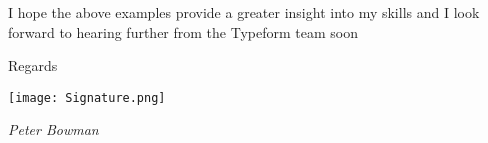 \documentclass[10pt,A4]{article}
\begin{document}
    \par \vspace{12pt}
    I hope the above examples provide a greater insight into my skills and I look forward to hearing further from the Typeform team soon    
    \par \vspace{8pt}
    Regards
    \par \vspace{8pt}
    \texttt{[image: Signature.png]}
    \par \vspace{2pt}
    \textit{ \textcolor{softcol} {Peter Bowman}}


    
    
\end{document}

